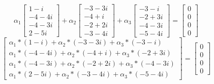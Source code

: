 \documentclass{article}
\begin{document}
            \[
                \alpha_1 
                \begin{bmatrix}
                    1 - i \\
                    -4 - 4i \\
                    -4 - 3i \\
                    2 - 5i
                \end{bmatrix}
                +
                \alpha_2
                \begin{bmatrix}
                    -3 - 3i \\
                    -4 + i \\
                    -2 + 2i \\
                    -3 - 4i
                \end{bmatrix}
                +
                \alpha_3
                \begin{bmatrix}
                    -3 - i \\
                    -2 + 3i \\
                    -4 - 3i \\
                    -5 - 4i
                \end{bmatrix}
                =
                \begin{bmatrix}
                    0 \\
                    0 \\
                    0 \\
                    0
                \end{bmatrix}
            \]
            \[
                \begin{bmatrix}
                    \alpha_1 * (1 - i) + \alpha_2 * (-3 - 3i) + \alpha_3 * (-3 - i)\\
                    \alpha_1 * (-4 - 4i) + \alpha_2 * (-4 + i) + \alpha_3 * (-2 + 3i)\\
                    \alpha_1 * (-4 - 3i) + \alpha_2 * (-2 + 2i) + \alpha_3 * (-4 - 3i)\\
                    \alpha_1 * (2 - 5i) + \alpha_2 * (-3 - 4i) + \alpha_3 * (-5 - 4i)
                \end{bmatrix}
                =
                \begin{bmatrix}
                    0 \\
                    0 \\
                    0 \\
                    0
                \end{bmatrix}
            \]
\end{document}

